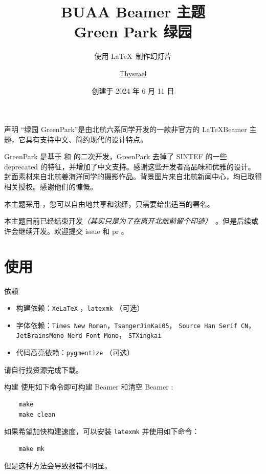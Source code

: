 \documentclass{ctexbeamer}
\title{BUAA Beamer 主题 \\ Green Park 绿园}
\subtitle{使用 \LaTeX\ 制作幻灯片}
\author{\href{https://github.com/Thysrael}{Thysrael}}
\date{创建于 2024 年 6 月 11 日}
\begin{document}
\maketitle

\begin{frame}{声明}
  “绿园 GreenPark”是由北航六系同学开发的一款非官方的 \LaTeX Beamer 主题，它具有支持中文、简约现代的设计特点。
  
  GreenPark 是基于  和  的二次开发，GreenPark 去掉了 SINTEF 的一些 deprecated 的特征，并增加了中文支持。感谢这些开发者高品味和优雅的设计。封面素材来自北航姜海洋同学的摄影作品。背景图片来自北航新闻中心，均已取得相关授权。感谢他们的慷慨。

  本主题采用 ，您可以自由地共享和演绎，只需要给出适当的署名。

  本主题目前已经结束开发\textsl{（其实只是为了在离开北航前留个印迹）}\   。但是后续或许会继续开发。欢迎提交 issue 和 pr 。

\end{frame}

\section{使用}
\begin{frame}{依赖}
  \begin{itemize}
  \item 构建依赖：\texttt{XeLaTeX} ，\texttt{latexmk} （可选）
  \item 字体依赖：\texttt{Times New Roman}，\texttt{TsangerJinKai05}， \texttt{Source Han Serif CN}，\texttt{JetBrainsMono Nerd Font Mono}， \texttt{STXingkai}
  \item 代码高亮依赖：\texttt{pygmentize} （可选）
  \end{itemize}

  请自行找资源完成下载。
\end{frame}

\begin{frame}[fragile]{构建}
  使用如下命令即可构建 Beamer 和清空 Beamer :
  
  \begin{verbatim}
    make
    make clean
  \end{verbatim}

  如果希望加快构建速度，可以安装 \texttt{latexmk} 并使用如下命令：

  \begin{verbatim}
    make mk
  \end{verbatim}

  但是这种方法会导致报错不明显。
\end{frame}
\end{document}
